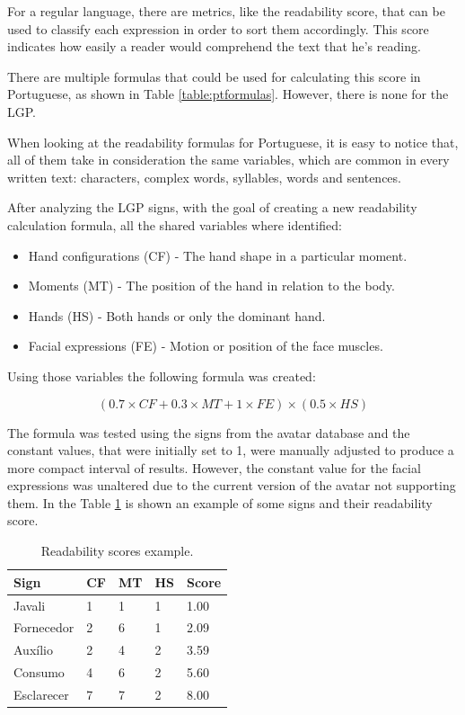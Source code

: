 \documentclass[runningheads]{llncs}
\begin{document}
For a regular language, there are metrics, like the readability score, that can be used to classify each expression in order to sort them accordingly.
This score indicates how easily a reader would comprehend the text that he's reading.

There are multiple formulas that could be used for calculating this score in Portuguese, as shown in Table \ref{table:ptformulas}.
However, there is none for the LGP.

When looking at the readability formulas for Portuguese, it is easy to notice that, all of them take in consideration the same variables, which are common in every written text: characters, complex words, syllables, words and sentences.

After analyzing the LGP signs, with the goal of creating a new readability calculation formula, all the shared variables where identified:

\begin{itemize}
    \item Hand configurations (CF) - The hand shape in a particular moment.
    \item Moments (MT) - The position of the hand in relation to the body.
    \item Hands (HS) - Both hands or only the dominant hand.
    \item Facial expressions (FE) - Motion or position of the face muscles.
\end{itemize}

Using those variables the following formula was created:

\begin{equation}
(0.7 \times CF + 0.3 \times MT + 1 \times FE) \times (0.5 \times HS)
\label{eqn1}
\end{equation}

The formula was tested using the signs from the avatar database and the constant values, that were initially set to 1, were manually adjusted to produce a more compact interval of results.
However, the constant value for the facial expressions was unaltered due to the current version of the avatar not supporting them.
In the Table \ref{table:signs} is shown an example of some signs and their readability score.

\begin{table}[H]
    \centering
    \caption{Readability scores example.}
    \label{table:signs}
    \begin{tabular}{l|l|l|l|l}
        {\bfseries Sign} & {\bfseries CF} & {\bfseries MT} & {\bfseries HS} & {\bfseries Score} \\
        \hline
        Javali & 1 & 1 & 1 & 1.00  \\
        \hline
        Fornecedor & 2 & 6 & 1 & 2.09  \\
        \hline
        Auxílio & 2 & 4 & 2 & 3.59 \\
        \hline
        Consumo & 4 & 6 & 2 & 5.60 \\
        \hline
        Esclarecer & 7 & 7 & 2 & 8.00 \\
    \end{tabular}
\end{table}
\end{document}

